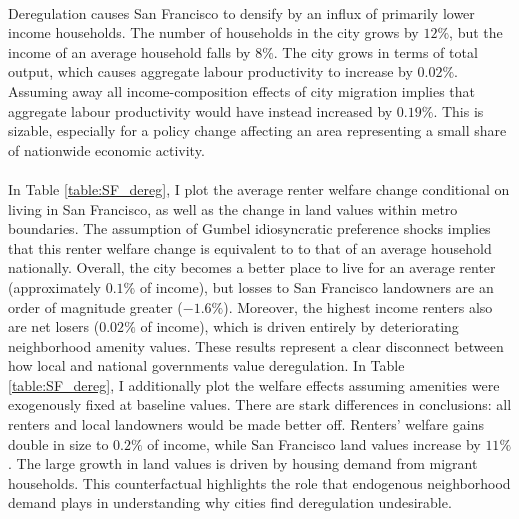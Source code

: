 \documentclass[12pt]{article}
\begin{document}
\paragraph*{}
 Deregulation causes San Francisco to densify by an influx of primarily lower income households. The number of households in the city grows by $12 \%$, but the income of an average household falls by $8 \%$.  The city grows in terms of total output, which causes aggregate labour productivity to increase by $0.02\%$. Assuming away all income-composition effects of city migration implies that aggregate labour productivity would have instead increased by $0.19\%$. This is sizable, especially for a policy change affecting an area representing a small share of nationwide economic activity.
 
 \paragraph*{}
 In Table \ref{table:SF_dereg}, I plot the average renter welfare change conditional on living in San Francisco, as well as the change in land values within metro boundaries. The assumption of Gumbel idiosyncratic preference shocks implies that this renter welfare change is equivalent to to that of an average household nationally. Overall, the city becomes a better place to live for an average renter (approximately $0.1\%$ of income), but losses to San Francisco landowners are an order of magnitude greater ($-1.6\%$). Moreover, the highest income renters also are net losers ($0.02\%$ of income), which is driven entirely by deteriorating neighborhood amenity values. These results represent a clear disconnect between how local and national governments value deregulation. In Table \ref{table:SF_dereg}, I additionally plot the welfare effects assuming amenities were exogenously fixed at baseline values. There are stark differences in conclusions: all renters and local landowners would be made better off. Renters' welfare gains double in size to $0.2\%$ of income, while San Francisco land values increase by $11 \%$. The large growth in land values is driven by housing demand from migrant households. This counterfactual highlights the role that endogenous neighborhood demand plays in understanding why cities find deregulation undesirable. 
 
\end{document}
